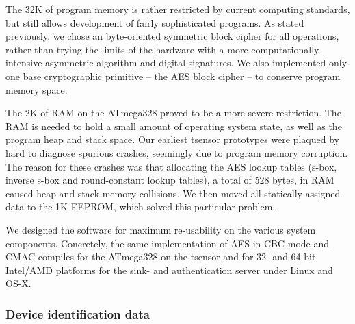 The 32K of program memory is rather restricted by current computing standards, but still allows development of fairly sophisticated programs. As stated previously, we chose an byte-oriented symmetric block cipher for all operations, rather than trying the limits of the hardware with a more computationally intensive asymmetric algorithm and digital signatures. We also implemented only one base cryptographic primitive -- the AES block cipher -- to conserve program memory space.

The 2K of RAM on the ATmega328 proved to be a more severe restriction. The RAM is needed to hold a small amount of operating system state, as well as the program heap and stack space. Our earliest tsensor prototypes were plaqued by hard to diagnose spurious crashes, seemingly due to program memory corruption. The reason for these crashes was that allocating the AES lookup tables (s-box, inverse s-box and round-constant lookup tables), a total of 528 bytes, in RAM caused heap and stack memory collisions. We then moved all statically assigned data to the 1K EEPROM, which solved this particular problem.

We designed the software for maximum re-usability on the various system components. Concretely, the same implementation of AES in CBC mode and CMAC compiles for the ATmega328 on the tsensor and for 32- and 64-bit Intel/AMD platforms for the sink- and authentication server under Linux and OS-X.

\subsubsection{Device identification data}

